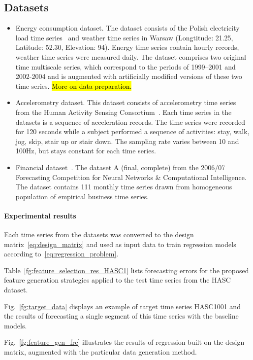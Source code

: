 \documentclass[conference]{IEEEtran}
\begin{document}
\subsection{Datasets}
\begin{itemize}
\item Energy consumption dataset. The dataset consists of the Polish electricity load time series~\cite{EnergyWeatherData} and weather time series in Warsaw (Longtitude: 21.25, Latitude: 52.30, Elevation: 94). Energy time series contain hourly records, weather time series were measured daily. The dataset comprises two original time multiscale series, which correspond to the periods of 1999--2001 and 2002-2004 and is augmented with artificially modified versions of these two time series. \hl{More on data preparation.}
\item Accelerometry dataset. This dataset consists of accelerometry time series from the Human Activity Sensing Consortium~\cite{HASCdata}. Each time series in the datasets is a sequence of acceleration records. The time series were recorded for 120 seconds while a subject performed a sequence of activities: stay, walk, jog, skip, stair up or stair down. The sampling rate varies between 10 and 100Hz, but stays constant for each time series.
\item Financial dataset~\cite{NNcompetition}.  The dataset A (final, complete) from the 2006/07 Forecasting Competition for Neural Networks \& Computational Intelligence. The dataset contains 111 monthly time series drawn from homogeneous population of empirical business time series.
\end{itemize}

\paragraph{Experimental results}
Each time series from the datasets was converted to the design matrix~\eqref{eq:design_matrix} and used as input data to train regression models according to~\eqref{eq:regression_problem}.

Table~\ref{fg:feature_selection_res_HASC1} lists forecasting errors for the proposed feature generation strategies applied to the test time series from the HASC dataset.

Fig.~\ref{fg:target_data} displays an example of target time series HASC1001 and the results of forecasting a single segment of this time series with the baseline models.

Fig.~\ref{fg:feature_gen_frc} illustrates the results of regression built on the design matrix, augmented with the particular data generation method.
\end{document}
